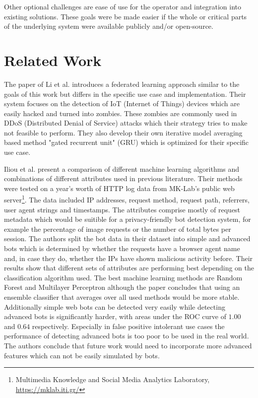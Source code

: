 \documentclass[
    fontsize=12pt,
    headings=small,
    parskip=half,           %
    bibliography=totoc,
    numbers=noenddot,       %
    open=any,               %
    final,                   %
    table
]{scrreprt}
\begin{document}
Other optional challenges are ease of use for the operator and integration into existing solutions. These goals were be made easier if the whole or critical parts of the underlying system were available publicly and/or open-source.

\section{Related Work}

The paper of Li et al. \cite{LiJi2021} introduces a federated learning approach similar to the goals of this work but differs in the specific use case and implementation. Their system focuses on the detection of IoT (Internet of Things) devices which are easily hacked and turned into zombies. These zombies are commonly used in DDoS (Distributed Denial of Service) attacks which their strategy tries to make not feasible to perform. They also develop their own iterative model averaging based method "gated recurrent unit" (GRU) which is optimized for their specific use case.

Iliou et al. \cite{10.1145/3339252.3339267} present a comparison of different machine learning algorithms and combinations of different attributes used in previous literature. Their methods were tested on a year's worth of HTTP log data from MK-Lab's public web server\footnote{Multimedia Knowledge and Social Media Analytics Laboratory, \url{https://mklab.iti.gr/}}. The data included IP addresses, request method, request path, referrers, user agent strings and timestamps. The attributes comprise mostly of request metadata which would be suitible for a privacy-friendly bot detection system, for example the percentage of image requests or the number of total bytes per session. The authors split the bot data in their dataset into simple and advanced bots which is determined by whether the requests have a browser agent name and, in case they do, whether the IPs have shown malicious activity before. Their results show that different sets of attributes are performing best depending on the classification algorithm used. The best machine learning methods are Random Forest and Multilayer Perceptron although the paper concludes that using an ensemble classifier that averages over all used methods would be more stable. Additionally simple web bots can be detected very easily while detecting advanced bots is significantly harder, with areas under the ROC curve of $1.00$ and $0.64$ respectively. Especially in false positive intolerant use cases the performance of detecting advanced bots is too poor to be used in the real world. The authors conclude that future work would need to incorporate more advanced features which can not be easily simulated by bots.
\end{document}
